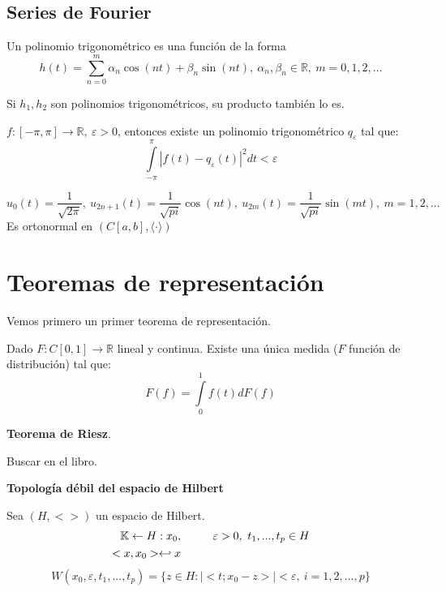 \documentclass[openany]{book}
\begin{document}
\subsection{Series de Fourier}

\begin{definition}
    Un polinomio trigonométrico es una función de la forma
    $$ h(t) = \sum\limits_{n=0}^{m} \alpha_n \cos(nt)+\beta_n \sin(nt),\ \alpha_n,\beta_n \in \mathbb{R},\ m = 0,1,2,... $$

\end{definition}

\begin{lemma}
    Si $ h_1,h_2 $ son polinomios trigonométricos, su producto también lo es.
\end{lemma}

\begin{lemma}
    $ f: [- \pi, \pi] \to \mathbb{R},\ \varepsilon>0 $, entonces existe un polinomio trigonométrico $ q_{\varepsilon} $ tal que:
    $$ \int\limits_{-\pi}^{\pi}|f(t)-q_{\varepsilon}(t)|^2 dt < \varepsilon $$
\end{lemma}

\begin{exercise}
    $$ u_0(t) = \dfrac{1}{\sqrt{2\pi}},\ u_{2n+1}(t) = \dfrac{1}{\sqrt{pi}} \cos(nt),\ u_{2m}(t) = \dfrac{1}{\sqrt{pi}} \sin(mt),\ m = 1,2,... $$
    Es ortonormal en $ (C[a,b],\langle\cdot \rangle) $
\end{exercise}


\section{Teoremas de representación}

Vemos primero un primer teorema de representación.

\begin{proposition}
    Dado $ F:C[0,1]\to \mathbb{R} $  lineal y continua. Existe una única medida ($ F $ función de distribución) tal que:
    $$ F(f) = \int\limits_{0}^{1}f(t)dF(f) $$
\end{proposition}



\begin{theorem}
    \textbf{Teorema de Riesz}.

    Buscar en el libro.
\end{theorem}


\begin{definition}\textbf{Topología débil del espacio de Hilbert}

    Sea $ (H,<>) $ un espacio de Hilbert. 
    $$ 
    \begin{aligned}
        \mathbb{K} \leftarrow H : x_0, & \hspace{10mm} \varepsilon>0,\  t_1,...,t_p \in H\\ <x,x_0> \hookleftarrow x
    \end{aligned}
    $$
    $$ W(x_0,\varepsilon,t_1,...,t_p) = \{z \in H: |<t;x_0-z>|< \varepsilon,\ i=1,2,...,p\} $$
\end{definition}
\end{document}
